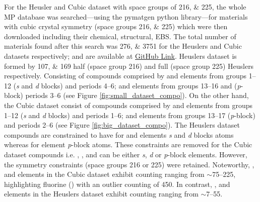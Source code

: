 \documentclass[article]{elsarticle}
\begin{document}
For the Heusler and Cubic dataset with space groups of \numlist{216;225}, the whole MP database was searched---using the pymatgen python library\cite{ONG2013314}---for materials with cubic crystal symmetry (space groups \numlist{216;225}) which were then downloaded including their chemical, structural, EBS. The total number of materials found after this search was \numlist{276;3751} for the Heuslers and Cubic datasets respectively; and are available at \href{https://github.com/Material-Mind/Heuslers-EBS-Dirac-points.git}{GitHub Link}. Heuslers dataset is formed by \numlist{107;169} half (space group 216) and full (space group 225) Heuslers respectively. Consisting of compounds comprised by  and  elements from groups \numrange{1}{12} (\textit{s} and \textit{d} blocks) and periods \numrange{4}{6}; and  elements from groups \numrange{13}{16} and (\textit{p}-block) periods \numrange{3}{6} (see Figure \ref{fig:small_dataset_compo}). On the other hand, the Cubic dataset consist of compounds comprised by  and  elements from groups \numrange{1}{12} (\textit{s} and \textit{d} blocks) and periods \numrange{1}{6}; and  elements from groups \numrange{13}{17} (\textit{p}-block) and periods \numrange{2}{6} (see Figure \ref{fig:big_dataset_compo}). The Heuslers dataset compounds are constrained to have for  and  elements \textit{s} and \textit{d} blocks atoms whereas for  element \textit{p}-block atoms. These constraints are removed for the Cubic dataset compounds i.e. , , and  can be either \textit{s}, \textit{d} or \textit{p}-block elements. However, the symmetry constraints (space groups 216 or 225) were retained. Noteworthy, ,  and  elements in the Cubic dataset exhibit counting ranging from $\sim$\numrange{75}{225}, highlighting fluorine () with an outlier counting of \num{450}. In contrast, ,  and  elements in the Heuslers dataset exhibit counting ranging from $\sim$\numrange{7}{55}. 
\end{document}
